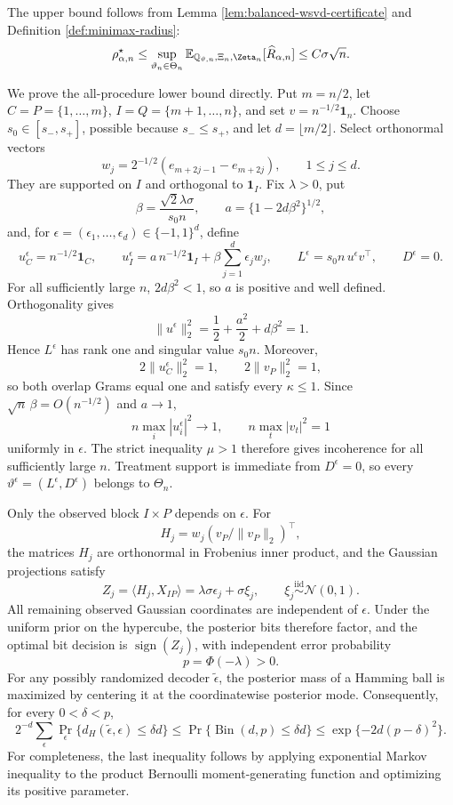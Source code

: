 The upper bound follows from Lemma \ref{lem:balanced-wsvd-certificate} and Definition \ref{def:minimax-radius}:
\[
\rho_{\alpha,n}^{\star}
\le\sup_{\vartheta_n\in\Theta_n}
\mathbb E_{\mathbb Q_{\vartheta,n},\Xi_n,\Zeta_n}
[\widehat R_{\alpha,n}]
\le C\sigma\sqrt n.
\]

We prove the all-procedure lower bound directly.  Put \(m=n/2\), let
\(C=P=\{1,\ldots,m\}\), \(I=Q=\{m+1,\ldots,n\}\), and set
\(v=n^{-1/2}\mathbf1_n\).  Choose \(s_0\in[s_-,s_+]\), possible because
\(s_-\le s_+\), and let \(d=\lfloor m/2\rfloor\).  Select orthonormal vectors
\[
w_j=2^{-1/2}(e_{m+2j-1}-e_{m+2j}),
\qquad 1\le j\le d.
\]
They are supported on \(I\) and orthogonal to \(\mathbf1_I\).  Fix
\(\lambda>0\), put
\[
\beta=\frac{\sqrt2\lambda\sigma}{s_0n},
\qquad
a=\{1-2d\beta^2\}^{1/2},
\]
and, for \(\epsilon=(\epsilon_1,\ldots,\epsilon_d)\in\{-1,1\}^d\), define
\[
u_C^\epsilon=n^{-1/2}\mathbf1_C,
\qquad
u_I^\epsilon=a\,n^{-1/2}\mathbf1_I
+\beta\sum_{j=1}^d\epsilon_jw_j,
\qquad
L^\epsilon=s_0n\,u^\epsilon v^{\top},
\qquad
D^\epsilon=0.
\]
For all sufficiently large \(n\), \(2d\beta^2<1\), so \(a\) is positive and well defined.  Orthogonality gives
\[
\lVert u^\epsilon\rVert_2^2
=\frac12+\frac{a^2}{2}+d\beta^2=1.
\]
Hence \(L^\epsilon\) has rank one and singular value \(s_0n\).  Moreover,
\[
2\lVert u_C^\epsilon\rVert_2^2=1,
\qquad
2\lVert v_P\rVert_2^2=1,
\]
so both overlap Grams equal one and satisfy every \(\kappa\le1\).  Since
\(\sqrt n\,\beta=O(n^{-1/2})\) and \(a\to1\),
\[
n\max_i|u_i^\epsilon|^2\longrightarrow1,
\qquad
n\max_t|v_t|^2=1
\]
uniformly in \(\epsilon\).  The strict inequality \(\mu>1\) therefore gives incoherence for all sufficiently large \(n\).  Treatment support is immediate from \(D^\epsilon=0\), so every
\(\vartheta^\epsilon=(L^\epsilon,D^\epsilon)\) belongs to \(\Theta_n\).

Only the observed block \(I\times P\) depends on \(\epsilon\).  For
\[
H_j=w_j(v_P/\lVert v_P\rVert_2)^{\top},
\]
the matrices \(H_j\) are orthonormal in Frobenius inner product, and the Gaussian projections satisfy
\[
Z_j=\langle H_j,X_{IP}\rangle
=\lambda\sigma\epsilon_j+\sigma\xi_j,
\qquad
\xi_j\overset{\mathrm{iid}}{\sim}\mathcal N(0,1).
\]
All remaining observed Gaussian coordinates are independent of \(\epsilon\).  Under the uniform prior on the hypercube, the posterior bits therefore factor, and the optimal bit decision is
\(\operatorname{sign}(Z_j)\), with independent error probability
\[
p=\Phi(-\lambda)>0.
\]
For any possibly randomized decoder \(\widetilde\epsilon\), the posterior mass of a Hamming ball is maximized by centering it at the coordinatewise posterior mode.  Consequently, for every \(0<\delta<p\),
\[
2^{-d}\sum_\epsilon
\Pr_\epsilon\{d_H(\widetilde\epsilon,\epsilon)\le\delta d\}
\le\Pr\{\operatorname{Bin}(d,p)\le\delta d\}
\le\exp\{-2d(p-\delta)^2\}.
\]
For completeness, the last inequality follows by applying exponential Markov inequality to the product Bernoulli moment-generating function and optimizing its positive parameter.

